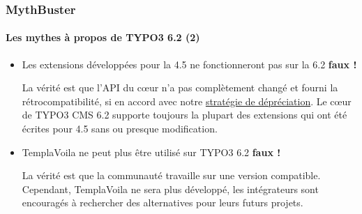 
\begin{frame}[fragile]
	\frametitle{MythBuster}
	\framesubtitle{Les mythes à propos de TYPO3 6.2 (2)}

	\begin{itemize}
		\item Les extensions développées pour la 4.5 ne fonctionneront pas sur la 6.2
			\tabto{9cm}\color{red}\textbf{\textrightarrow faux !}\color{black}

			\smaller
				La vérité est que l'API du cœur n'a pas complètement changé et fourni la rétrocompatibilité, si en accord avec notre \href{http://forge.typo3.org/projects/typo3v4-core/wiki/CoreDevPolicy}{stratégie de dépréciation}. Le cœur de TYPO3 CMS 6.2 supporte toujours la plupart des extensions qui ont été écrites pour 4.5 sans ou presque modification.
			\normalsize
			
		\item TemplaVoila ne peut plus être utilisé sur TYPO3 6.2
			\tabto{9cm}\color{red}\textbf{\textrightarrow faux !}\color{black}
			
			\smaller
				La vérité est que la communauté travaille sur une version compatible. Cependant, TemplaVoila ne sera plus développé, les intégrateurs sont encouragés à rechercher des alternatives pour leurs futurs projets.
			\normalsize

	\end{itemize}

\end{frame}


